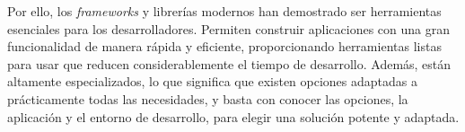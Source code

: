 Por ello, los \textit{frameworks} y librerías modernos han demostrado ser herramientas esenciales para los desarrolladores. Permiten construir aplicaciones con una gran funcionalidad de manera rápida y eficiente, proporcionando herramientas listas para usar que reducen considerablemente el tiempo de desarrollo. Además, están altamente especializados, lo que significa que existen opciones adaptadas a prácticamente todas las necesidades, y basta con conocer las opciones, la aplicación y el entorno de desarrollo, para elegir una solución potente y adaptada. 
